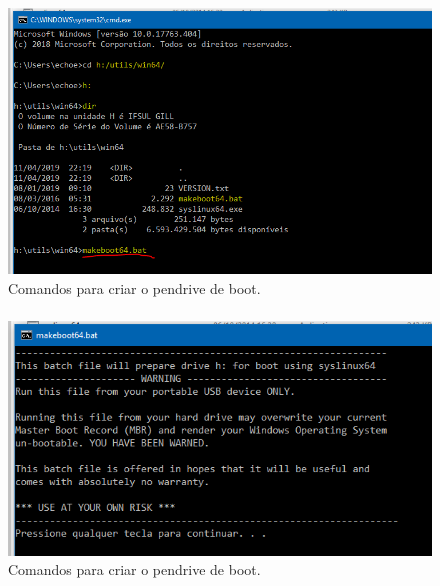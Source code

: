 \documentclass{beamer}
\begin{document}
\begin{frame}[plain,c]
    \frametitle{\insertsection}
    \framesubtitle{\insertsubsection}
    \begin{figure}
        \centering
        \includegraphics[scale=0.6]{images/pendrivewin3.png}
        \caption{Comandos para criar o pendrive de boot.}
    \end{figure}  
\end{frame}
\begin{frame}[plain,c]
    \frametitle{\insertsection}
    \framesubtitle{\insertsubsection}
    \begin{figure}
        \centering
        \includegraphics[scale=0.6]{images/pendrivewin4.png}
        \caption{Comandos para criar o pendrive de boot.}
    \end{figure}  
\end{frame}
\end{document}
